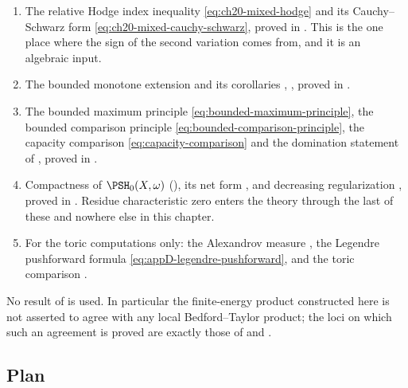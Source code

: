 \begin{enumerate}
\item\label{itm:ch26-import:hodge}
 The relative Hodge index inequality \eqref{eq:ch20-mixed-hodge} and its
 Cauchy--Schwarz form \eqref{eq:ch20-mixed-cauchy-schwarz}, proved in
 .  This is the one place where the sign of the
 second variation comes from, and it is an algebraic input.
\item\label{itm:ch26-import:bounded}
 The bounded monotone extension  and its
 corollaries ,
 , proved in .
\item\label{itm:ch26-import:capacity}
 The bounded maximum principle \eqref{eq:bounded-maximum-principle}, the
 bounded comparison principle \eqref{eq:bounded-comparison-principle}, the
 capacity comparison \eqref{eq:capacity-comparison} and the domination
 statement of , proved in
 .
\item\label{itm:ch26-import:compactness}
 Compactness of \(\PSH_0(X,\omega)\) (), its net
 form , and decreasing regularization
 , proved in
 .  Residue characteristic zero enters the theory
 through the last of these and nowhere else in this chapter.
\item\label{itm:ch26-import:convex}
 For the toric computations only: the Alexandrov measure
 , the Legendre pushforward formula
 \eqref{eq:appD-legendre-pushforward}, and the toric comparison
 .
\end{enumerate}

No result of  is used.  In particular the finite-energy product
constructed here is not asserted to agree with any local Bedford--Taylor
product; the loci on which such an agreement is proved are exactly those of
 and .

\subsection{Plan}
\label{sec:ch26-plan}

